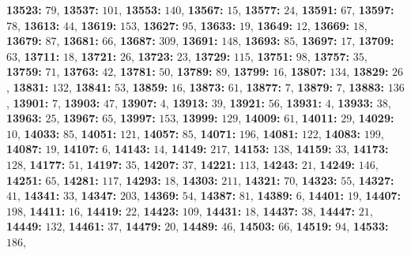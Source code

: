 \textsf{\bfseries 13523:} $79$, \textsf{\bfseries 13537:} $101$, \textsf{\bfseries 13553:} $140$, \textsf{\bfseries 13567:} $15$, \textsf{\bfseries 13577:} $24$, \textsf{\bfseries 13591:} $67$, \textsf{\bfseries 13597:} $78$, \textsf{\bfseries 13613:} $44$, \textsf{\bfseries 13619:} $153$, \textsf{\bfseries 13627:} $95$, \textsf{\bfseries 13633:} $19$, \textsf{\bfseries 13649:} $12$, \textsf{\bfseries 13669:} $18$, \textsf{\bfseries 13679:} $87$, \textsf{\bfseries 13681:} $66$, \textsf{\bfseries 13687:} $309$, \textsf{\bfseries 13691:} $148$, \textsf{\bfseries 13693:} $85$, \textsf{\bfseries 13697:} $17$, \textsf{\bfseries 13709:} $63$, \textsf{\bfseries 13711:} $18$, \textsf{\bfseries 13721:} $26$, \textsf{\bfseries 13723:} $23$, \textsf{\bfseries 13729:} $115$, \textsf{\bfseries 13751:} $98$, \textsf{\bfseries 13757:} $35$, \textsf{\bfseries 13759:} $71$, \textsf{\bfseries 13763:} $42$, \textsf{\bfseries 13781:} $50$, \textsf{\bfseries 13789:} $89$, \textsf{\bfseries 13799:} $16$, \textsf{\bfseries 13807:} $134$, \textsf{\bfseries 13829:} $26$, \textsf{\bfseries 13831:} $132$, \textsf{\bfseries 13841:} $53$, \textsf{\bfseries 13859:} $16$, \textsf{\bfseries 13873:} $61$, \textsf{\bfseries 13877:} $7$, \textsf{\bfseries 13879:} $7$, \textsf{\bfseries 13883:} $136$, \textsf{\bfseries 13901:} $7$, \textsf{\bfseries 13903:} $47$, \textsf{\bfseries 13907:} $4$, \textsf{\bfseries 13913:} $39$, \textsf{\bfseries 13921:} $56$, \textsf{\bfseries 13931:} $4$, \textsf{\bfseries 13933:} $38$, \textsf{\bfseries 13963:} $25$, \textsf{\bfseries 13967:} $65$, \textsf{\bfseries 13997:} $153$, \textsf{\bfseries 13999:} $129$, \textsf{\bfseries 14009:} $61$, \textsf{\bfseries 14011:} $29$, \textsf{\bfseries 14029:} $10$, \textsf{\bfseries 14033:} $85$, \textsf{\bfseries 14051:} $121$, \textsf{\bfseries 14057:} $85$, \textsf{\bfseries 14071:} $196$, \textsf{\bfseries 14081:} $122$, \textsf{\bfseries 14083:} $199$, \textsf{\bfseries 14087:} $19$, \textsf{\bfseries 14107:} $6$, \textsf{\bfseries 14143:} $14$, \textsf{\bfseries 14149:} $217$, \textsf{\bfseries 14153:} $138$, \textsf{\bfseries 14159:} $33$, \textsf{\bfseries 14173:} $128$, \textsf{\bfseries 14177:} $51$, \textsf{\bfseries 14197:} $35$, \textsf{\bfseries 14207:} $37$, \textsf{\bfseries 14221:} $113$, \textsf{\bfseries 14243:} $21$, \textsf{\bfseries 14249:} $146$, \textsf{\bfseries 14251:} $65$, \textsf{\bfseries 14281:} $117$, \textsf{\bfseries 14293:} $18$, \textsf{\bfseries 14303:} $211$, \textsf{\bfseries 14321:} $70$, \textsf{\bfseries 14323:} $55$, \textsf{\bfseries 14327:} $41$, \textsf{\bfseries 14341:} $33$, \textsf{\bfseries 14347:} $203$, \textsf{\bfseries 14369:} $54$, \textsf{\bfseries 14387:} $81$, \textsf{\bfseries 14389:} $6$, \textsf{\bfseries 14401:} $19$, \textsf{\bfseries 14407:} $198$, \textsf{\bfseries 14411:} $16$, \textsf{\bfseries 14419:} $22$, \textsf{\bfseries 14423:} $109$, \textsf{\bfseries 14431:} $18$, \textsf{\bfseries 14437:} $38$, \textsf{\bfseries 14447:} $21$, \textsf{\bfseries 14449:} $132$, \textsf{\bfseries 14461:} $37$, \textsf{\bfseries 14479:} $20$, \textsf{\bfseries 14489:} $46$, \textsf{\bfseries 14503:} $66$, \textsf{\bfseries 14519:} $94$, \textsf{\bfseries 14533:} $186$, 
